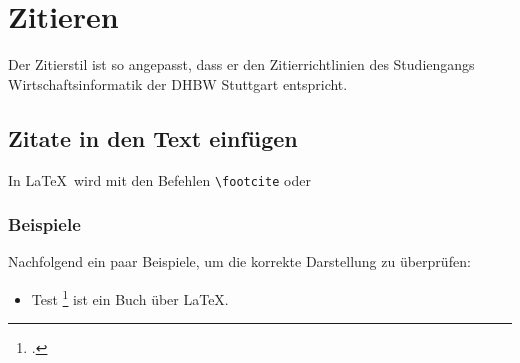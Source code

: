 \chapter{Zitieren}\label{chapter:zitate}

Der Zitierstil ist so angepasst, dass er den Zitierrichtlinien des Studiengangs Wirtschaftsinformatik der DHBW Stuttgart entspricht. 

\section{Zitate in den Text einfügen}
In \LaTeX\ wird mit den Befehlen \verb|\footcite| 
oder 

\subsection{Beispiele}
Nachfolgend ein paar Beispiele, um die korrekte Darstellung zu überprüfen:

\begin{itemize}
\item Test \footcite{Wilde2007} ist ein Buch über \LaTeX.

\end{itemize}
